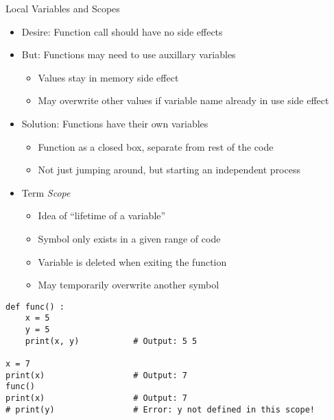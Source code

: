 
\begin{frame}{Local Variables and Scopes}
%
\begin{itemize}
\item Desire: Function call should have no side effects
\item But: Functions may need to use auxillary variables
	\begin{itemize}
	\item Values stay in memory \thus side effect
	\item May overwrite other values if variable name already in use \thus side effect
	\end{itemize}
\item Solution: Functions have their own variables
	\begin{itemize}
	\item Function as a closed box, separate from rest of the code
	\item Not just jumping around, but starting an independent process
	\end{itemize}
\item Term \emph{Scope}
	\begin{itemize}
	\item Idea of \enquote{lifetime of a variable}
	\item Symbol only exists in a given range of code
	\item Variable is deleted when exiting the function
	\item May temporarily overwrite another symbol
	\end{itemize}
\end{itemize}
%
\end{frame}


\begin{frame}[fragile]
%
\begin{codebox}
\begin{verbatim}
def func() :
    x = 5
    y = 5
    print(x, y)           # Output: 5 5

x = 7
print(x)                  # Output: 7
func()
print(x)                  # Output: 7
# print(y)                # Error: y not defined in this scope!
\end{verbatim}
\end{codebox}
%
\end{frame}

